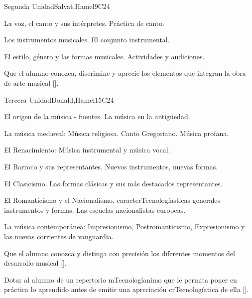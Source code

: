 \begin{syllabus}
\begin{unit}{}{Segunda Unidad}{Salvat,Hamel}{9}{C24}
\begin{topics}
	\item La voz, el canto y sus intérpretes. Práctica de canto.
	\item Los instrumentos musicales. El conjunto instrumental.
	\item El estilo, género y las formas musicales. Actividades y audiciones.
\end{topics}
\begin{learningoutcomes}
	\item Que el alumno conozca, discrimine y aprecie los elementos que integran la obra de arte musical [\Usage].
\end{learningoutcomes}
\end{unit}

\begin{unit}{}{Tercera Unidad}{Donald,Hamel}{15}{C24}
\begin{topics}
	\item El origen de la música - fuentes. La música en la antigüedad.
	\item La música medieval: Música religiosa.  Canto Gregoriano. Música profana.
	\item El Renacimiento: Música instrumental y música vocal.
	\item El Barroco y sus representantes. Nuevos instrumentos, nuevas formas.
	\item El Clasicismo. Las formas clásicas y sus más destacados representantes.
	\item El Romanticismo y el Nacionalismo, caracterTecnologíasticas generales instrumentos y formas. Las escuelas nacionalistas europeas.
	\item La música contemporánea: Impresionismo, Postromanticismo, Expresionismo y las nuevas corrientes de vanguardia.
\end{topics}
\begin{learningoutcomes}
	\item Que el alumno conozca y distinga con precisión los diferentes momentos del desarrollo musical [\Usage].
	\item Dotar al alumno de un repertorio mTecnologíanimo que le permita poner en práctica lo aprendido antes de emitir una apreciación crTecnologíatica de ella [\Usage].
\end{learningoutcomes}
\end{unit}


\end{syllabus}
